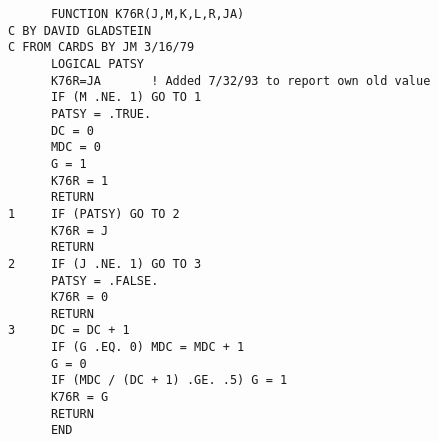 \blankscreen{}
\begin{frame}[fragile]
    \begin{verbatim}
            FUNCTION K76R(J,M,K,L,R,JA)
      C BY DAVID GLADSTEIN
      C FROM CARDS BY JM 3/16/79
            LOGICAL PATSY
            K76R=JA       ! Added 7/32/93 to report own old value
            IF (M .NE. 1) GO TO 1
            PATSY = .TRUE.
            DC = 0
            MDC = 0
            G = 1
            K76R = 1
            RETURN
      1     IF (PATSY) GO TO 2
            K76R = J
            RETURN
      2     IF (J .NE. 1) GO TO 3
            PATSY = .FALSE.
            K76R = 0
            RETURN
      3     DC = DC + 1
            IF (G .EQ. 0) MDC = MDC + 1
            G = 0
            IF (MDC / (DC + 1) .GE. .5) G = 1
            K76R = G
            RETURN
            END
    \end{verbatim}
\end{frame}
